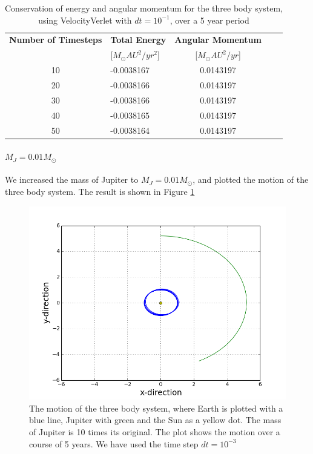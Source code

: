 \documentclass[norsk,a4paper,12pt]{article}
\begin{document}
{\begin{table} [H]
\centering
\caption{Conservation of energy and angular momentum for the three body system, using VelocityVerlet with $dt=10^{-1}$, over a 5 year period}
\begin{tabularx}{\textwidth}{cXcXc} \toprule
    {\bf Number of Timesteps} & {\bf Total Energy }& {\bf Angular Momentum} \\
    &[$M_\odot AU^2/yr^2$]&[$M_\odot AU^2/yr$]\\ \hline
    10 & -0.0038167 & 0.0143197\\ \hline
    20 & -0.0038166 & 0.0143197\\ \hline
    30 & -0.0038166 & 0.0143197\\ \hline
    40 & -0.0038165 & 0.0143197\\ \hline
    50 & -0.0038164 & 0.0143197\\ \bottomrule 
\end{tabularx}
\label{threebody_energy_dt=10(-1)}
\end{table}

\paragraph{\textbf{$M_J = 0.01M_{\odot}$}}

We increased the mass of Jupiter to $M_J = 0.01M_{\odot}$, and plotted the motion of the three body system. The result is shown in Figure \ref{fig:Jupiter_m=10^(-2)_Earth}

\begin{figure} [H]
    \centering
    \includegraphics[scale=0.6]{oppg_3e_threebody_Jupiter_m=10_(-2)_Earth}
    \caption{The motion of the three body system, where Earth is plotted with a blue line, Jupiter with green and the Sun as a yellow dot. The mass of Jupiter is 10 times its original. The plot shows the motion over a course of 5 years. We have used the time step $dt = 10^{-3}$}
    \label{fig:Jupiter_m=10^(-2)_Earth}
\end{figure}

}
\end{document}
